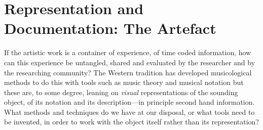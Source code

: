 
\section*{Representation and Documentation: The Artefact}
\label{sec:repr-docum-artef}

If the artistic work is a container of experience, of time coded information, how can this experience be untangled, shared and evaluated by the researcher and by the researching community? The Western tradition has developed musicological methods to do this with tools such as music theory and musical notation but these are, to some degree, leaning on \emph{visual} representations of the sounding object, of its notation and its description---in principle second hand information. What methods and techniques do we have at our disposal, or what tools need to be invented, in order to work with the object itself rather than its representation?

